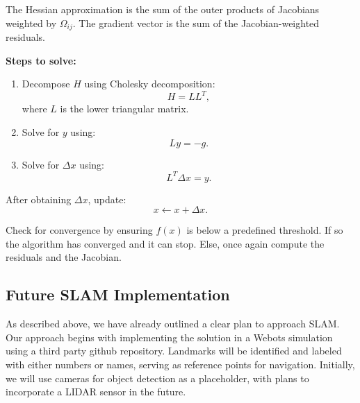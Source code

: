 \begin{enumerate}
    The Hessian approximation is the sum of the outer products of Jacobians weighted by $\Omega_{ij}$. The gradient vector is the sum of the Jacobian-weighted residuals.

    \textbf{Steps to solve:}
    \begin{enumerate}
        \item Decompose $H$ using Cholesky decomposition:
        \[
        H = L L^T,
        \]
        where $L$ is the lower triangular matrix.
        \item Solve for $y$ using:
        \[
        L y = -g.
        \]
        \item Solve for $\Delta x$ using:
        \[
        L^T \Delta x = y.
        \]
    \end{enumerate}

    After obtaining $\Delta x$, update:
    \[
    x \leftarrow x + \Delta x.
    \]

    Check for convergence by ensuring $f(x)$ is below a predefined threshold. If so the algorithm has converged and it can stop.
    Else, once again compute the residuals and the Jacobian.
    \subsection*{Future SLAM Implementation}
    As described above, we have already outlined a clear plan to approach SLAM. Our approach begins with implementing the solution in a Webots simulation using a third party github repository. Landmarks will be identified and labeled with either numbers or names, serving as reference points for navigation. Initially, we will use cameras for object detection as a placeholder, with plans to incorporate a LIDAR sensor in the future.
\end{enumerate}

